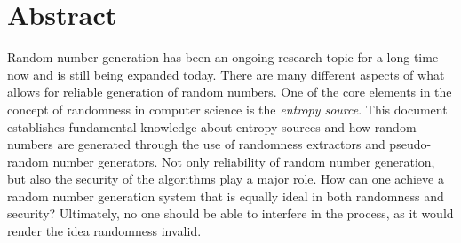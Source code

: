 \section*{Abstract}
Random number generation has been an ongoing research topic for a long time now and is still being expanded today.
There are many different aspects of what allows for reliable generation of random numbers.
One of the core elements in the concept of randomness in computer science is the \emph{entropy source}.
\newline
This document establishes fundamental knowledge about entropy sources and how random numbers are generated through the use of randomness extractors and pseudo-random number generators.
Not only reliability of random number generation, but also the security of the algorithms play a major role.
How can one achieve a random number generation system that is equally ideal in both randomness and security?
Ultimately, no one should be able to interfere in the process, as it would render the idea randomness invalid.